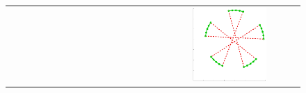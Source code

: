\documentclass[11pt,a4paper]{book}
\newcommand{\wToy}{0.288}
\begin{document}
\begin{figure}[h!]
\begin{tabular}{rccc}
    \includegraphics[width=\wToy\textwidth]{img-sgd/toy.10.l} \\


\end{tabular}
\end{figure}
\end{document}
